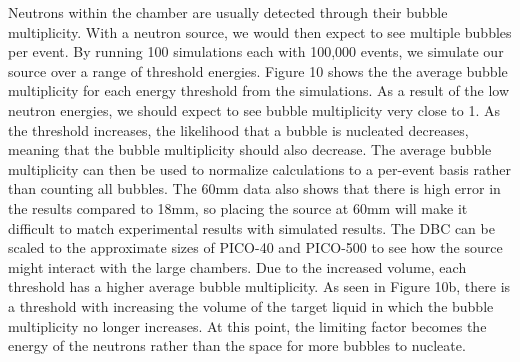 \documentclass[%
12pt,
twoside,
reprint,
amsmath,amssymb,
aps,
]{article}
\begin{document}
	\par Neutrons within the chamber are usually detected through their bubble multiplicity. With a neutron source, we would then expect to see multiple bubbles per event. By running 100 simulations each with 100,000 events, we simulate our source over a range of threshold energies. Figure 10 shows the the average bubble multiplicity for each energy threshold from the simulations. As a result of the low neutron energies, we should expect to see bubble multiplicity very close to 1. As the threshold increases, the likelihood that a bubble is nucleated decreases, meaning that the bubble multiplicity should also decrease. The average bubble multiplicity can then be used to normalize calculations to a per-event basis rather than counting all bubbles. The 60mm data also shows that there is high error in the results compared to 18mm, so placing the source at 60mm will make it difficult to match experimental results with simulated results. The DBC can be scaled to the approximate sizes of PICO-40 and PICO-500 to see how the source might interact with the large chambers. Due to the increased volume, each threshold has a higher average bubble multiplicity. As seen in Figure 10b, there is a threshold with increasing the volume of the target liquid in which the bubble multiplicity no longer increases. At this point, the limiting factor becomes the energy of the neutrons rather than the space for more bubbles to nucleate.
	
\end{document}
